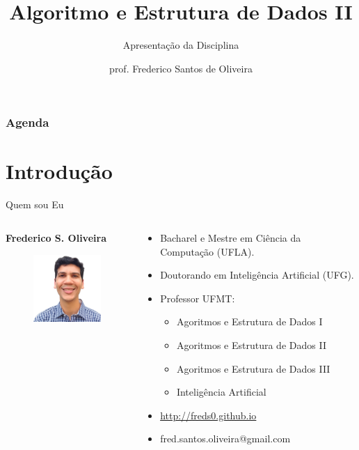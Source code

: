 \documentclass[aspectratio=169]{beamer}
\title[Apresentação da Disciplina]{Algoritmo e Estrutura de Dados II}
\subtitle{Apresentação da Disciplina}
\author[Frederico Santos de Oliveira]{prof. Frederico Santos de Oliveira}
\institute[UFMT]{Universidade Federal de Mato Grosso\\ Faculdade de Engenharia}
\date{}
\begin{document}
\begin{frame}[plain]
  \titlepage
\end{frame}


\begin{frame}
  \frametitle{Agenda}
  \tableofcontents
\end{frame}

\section{Introdução}

\begin{frame}{Quem sou Eu}
\begin{columns}[T] %
\begin{column}{.30\textwidth}
{\bf Frederico S. Oliveira}
\begin{figure}[h]
\includegraphics[width=3.5cm]{imgs/perfil.png}
\end{figure}
\end{column}%
\hfill%
\begin{column}{.64\textwidth}
\begin{itemize}
\item Bacharel e Mestre em Ciência da Computação (UFLA). 
\item Doutorando em Inteligência Artificial (UFG). 
\item Professor UFMT:
\begin{itemize}
\item Agoritmos e Estrutura de Dados I
\item Agoritmos e Estrutura de Dados II
\item Agoritmos e Estrutura de Dados III
\item Inteligência Artificial
\end{itemize}
\item \href{http://freds0.github.io}{http://freds0.github.io}
\item fred.santos.oliveira@gmail.com
\end{itemize}
\end{column}%

\end{columns}
\end{frame}
\end{document}
